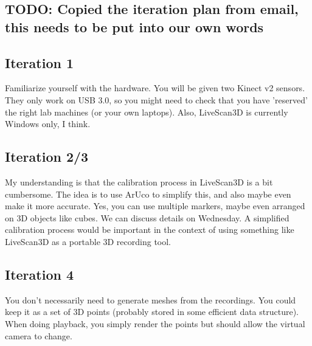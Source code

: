 \documentclass[a4paper,12pt]{article}
\begin{document}
\subsection*{TODO: Copied the iteration plan from email, this needs to be put into our own words}
\subsection*{Iteration 1}
Familiarize yourself with the hardware. You will be given two Kinect v2 sensors. They only work on USB 3.0, so you might need to check that you have 'reserved' the right lab machines (or your own laptops). Also, LiveScan3D is currently Windows only, I think.

\subsection*{Iteration 2/3}
My understanding is that the calibration process in LiveScan3D is a bit cumbersome. The idea is to use ArUco to simplify this, and also maybe even make it more accurate. Yes, you can use multiple markers, maybe even arranged on 3D objects like cubes. We can discuss details on Wednesday. A simplified calibration process would be important in the context of using something like LiveScan3D as a portable 3D recording tool.

\subsection*{Iteration 4}
You don't necessarily need to generate meshes from the recordings. You could keep it as a set of 3D points (probably stored in some efficient data structure). When doing playback, you simply render the points but should allow the virtual camera to change.
\end{document}
